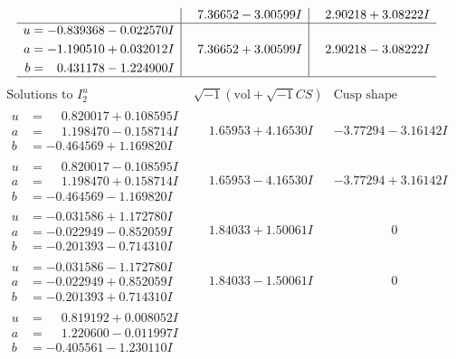\documentclass[1p]{elsarticle_modified}
\theoremstyle{definition}
\newcommand{\I}{\sqrt{-1}}
\begin{document}
$$\begin{array}{c|c|c}
 & \phantom{-}7.36652 - 3.00599 I & \phantom{-}2.90218 + 3.08222 I \\ \hline\begin{aligned}
u &= -0.839368 - 0.022570 I \\
a &= -1.190510 + 0.032012 I \\
b &= \phantom{-}0.431178 - 1.224900 I\end{aligned}
 & \phantom{-}7.36652 + 3.00599 I & \phantom{-}2.90218 - 3.08222 I\\
 \hline 
 \end{array}$$\newpage$$\begin{array}{c|c|c}  
\text{Solutions to }I^u_{2}& \I (\text{vol} + \sqrt{-1}CS) & \text{Cusp shape}\\
 \hline 
\begin{aligned}
u &= \phantom{-}0.820017 + 0.108595 I \\
a &= \phantom{-}1.198470 - 0.158714 I \\
b &= -0.464569 + 1.169820 I\end{aligned}
 & \phantom{-}1.65953 + 4.16530 I & -3.77294 - 3.16142 I \\ \hline\begin{aligned}
u &= \phantom{-}0.820017 - 0.108595 I \\
a &= \phantom{-}1.198470 + 0.158714 I \\
b &= -0.464569 - 1.169820 I\end{aligned}
 & \phantom{-}1.65953 - 4.16530 I & -3.77294 + 3.16142 I \\ \hline\begin{aligned}
u &= -0.031586 + 1.172780 I \\
a &= -0.022949 - 0.852059 I \\
b &= -0.201393 - 0.714310 I\end{aligned}
 & \phantom{-}1.84033 + 1.50061 I & \phantom{-0.000000 } 0 \\ \hline\begin{aligned}
u &= -0.031586 - 1.172780 I \\
a &= -0.022949 + 0.852059 I \\
b &= -0.201393 + 0.714310 I\end{aligned}
 & \phantom{-}1.84033 - 1.50061 I & \phantom{-0.000000 } 0 \\ \hline\begin{aligned}
u &= \phantom{-}0.819192 + 0.008052 I \\
a &= \phantom{-}1.220600 - 0.011997 I \\
b &= -0.405561 - 1.230110 I\end{aligned}

\end{array}$$
\end{document}
